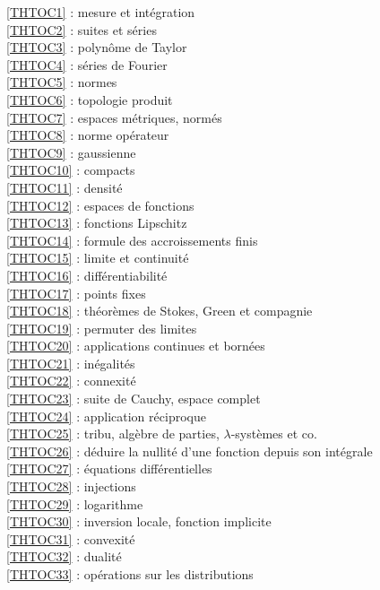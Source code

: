 \ref{THTOC1} : mesure et intégration\\
\ref{THTOC2} : suites et séries\\
\ref{THTOC3} : polynôme de Taylor\\
\ref{THTOC4} : séries de Fourier\\
\ref{THTOC5} : normes\\
\ref{THTOC6} : topologie produit\\
\ref{THTOC7} : espaces métriques, normés\\
\ref{THTOC8} : norme opérateur\\
\ref{THTOC9} : gaussienne\\
\ref{THTOC10} : compacts\\
\ref{THTOC11} : densité\\
\ref{THTOC12} : espaces de fonctions\\
\ref{THTOC13} : fonctions Lipschitz\\
\ref{THTOC14} : formule des accroissements finis\\
\ref{THTOC15} : limite et continuité\\
\ref{THTOC16} : différentiabilité\\
\ref{THTOC17} : points fixes\\
\ref{THTOC18} : théorèmes de Stokes, Green et compagnie\\
\ref{THTOC19} : permuter des limites\\
\ref{THTOC20} : applications continues et bornées\\
\ref{THTOC21} : inégalités\\
\ref{THTOC22} : connexité\\
\ref{THTOC23} : suite de Cauchy, espace complet\\
\ref{THTOC24} : application réciproque\\
\ref{THTOC25} : tribu, algèbre de parties, \( \lambda \)-systèmes et co.\\
\ref{THTOC26} : déduire la nullité d'une fonction depuis son intégrale\\
\ref{THTOC27} : équations différentielles\\
\ref{THTOC28} : injections\\
\ref{THTOC29} : logarithme\\
\ref{THTOC30} : inversion locale, fonction implicite\\
\ref{THTOC31} : convexité\\
\ref{THTOC32} : dualité\\
\ref{THTOC33} : opérations sur les distributions\\
